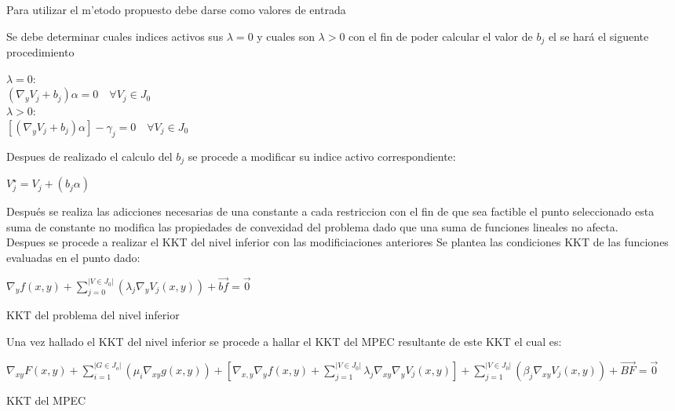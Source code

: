 Para utilizar el m'etodo propuesto debe darse como valores de entrada 


Se debe determinar cuales indices activos sus $\lambda = 0$ y cuales son $\lambda>0$ con el fin de poder calcular el valor de $b_j$ el se hará el siguente procedimiento

\begin{table}[H]
	$\lambda =0$:\\
	$(\nabla_{y}V_j+b_j)\alpha=0 \quad \forall V_j \in J_0$ \\
	$\lambda>0$:\\
	$[(\nabla_{y}V_j+b_j)\alpha]-\gamma_j=0 \quad \forall V_j \in J_0$


\end{table}

Despues de realizado el calculo del $b_j$ se procede a modificar su indice activo correspondiente:

\begin{table}[H]
	$V_{j}^{\star}=V_{j}+(b_j\alpha)$
\end{table}

Después se realiza las adicciones necesarias de una constante a cada restriccion con el fin de que sea factible el punto seleccionado
esta suma de constante no modifica las propiedades de convexidad del problema dado que una suma de funciones lineales no afecta.\\


Despues se procede a realizar el KKT del nivel inferior con las modificiaciones anteriores 
Se plantea las condiciones KKT de las funciones evaluadas en el punto dado:
\begin{table}[H]
	$\nabla_{y}f(x,y)+\sum_{j=0}^{|V \in J_0|}(\lambda_j\nabla_{y}V_j(x,y))+\vec{bf}=\vec{0}$
\caption*{KKT del problema del nivel inferior}
\end{table}


Una vez hallado el KKT del nivel inferior se procede a hallar el KKT del MPEC resultante de este KKT el cual es:

\begin{table}[H]
	$\nabla_{xy}F(x,y)+\sum_{i=1}^{|G \in J_o|}(\mu_i\nabla_{xy}g(x,y))+[\nabla_{x,y}\nabla_{y}f(x,y)+\sum_{j=1}^{|V \in J_0|}\lambda_j\nabla_{xy}\nabla_{y}V_j(x,y)]+\sum_{j=1}^{|V \in J_0|}(\beta_j\nabla_{xy}V_j(x,y))+\vec{BF}=\vec{0}$
\caption*{KKT del MPEC}
\end{table}

